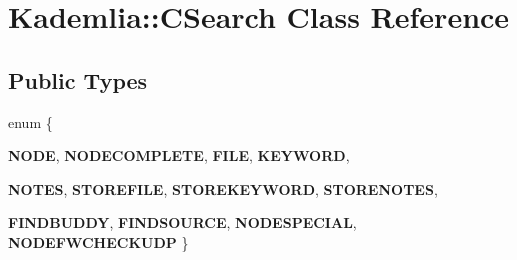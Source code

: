 \section{Kademlia::CSearch Class Reference}
\label{classKademlia_1_1CSearch}
\subsection*{Public Types}
\begin{DoxyCompactItemize}
\item 
enum \{ \par
{\bfseries NODE}, 
{\bfseries NODECOMPLETE}, 
{\bfseries FILE}, 
{\bfseries KEYWORD}, 
\par
{\bfseries NOTES}, 
{\bfseries STOREFILE}, 
{\bfseries STOREKEYWORD}, 
{\bfseries STORENOTES}, 
\par
{\bfseries FINDBUDDY}, 
{\bfseries FINDSOURCE}, 
{\bfseries NODESPECIAL}, 
{\bfseries NODEFWCHECKUDP}
 \}
\end{DoxyCompactItemize}
